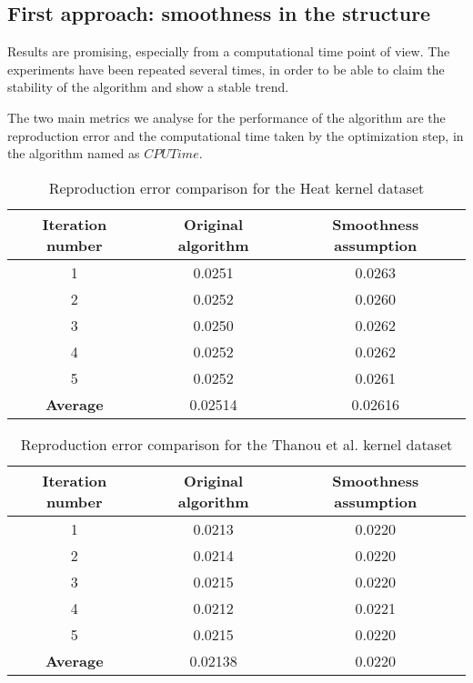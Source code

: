 \subsection{First approach: smoothness in the structure}
Results are promising, especially from a computational time point of view. The experiments have been repeated several times, in order to be able to claim the stability of the algorithm and show a stable trend.

The two main metrics we analyse for the performance of the algorithm are the reproduction error and the computational time taken by the optimization step, in the algorithm named as $CPUTime$.

\begin{table}[htbp]
  \centering
  \begin{tabular}{c|c|c}
    \multicolumn{1}{c|}{\textbf{Iteration number}} &
    \multicolumn{1}{c}{\textbf{Original algorithm}} &
    \multicolumn{1}{|c}{\textbf{Smoothness assumption}}\\
    \hline
    1 & 0.0251 & 0.0263\\
    2 & 0.0252 & 0.0260\\
    3 & 0.0250 & 0.0262\\
    4 & 0.0252 & 0.0262\\
    5 & 0.0252 & 0.0261\\
    \textbf{Average} & 0.02514 & 0.02616\\
  \end{tabular}
  \caption{Reproduction error comparison for the Heat kernel dataset}
  \label{tab:errorHeat_struct}
\end{table}

\begin{table}[htbp]
  \centering
  \begin{tabular}{c|c|c}
    \multicolumn{1}{c|}{\textbf{Iteration number}} &
    \multicolumn{1}{c}{\textbf{Original algorithm}} &
    \multicolumn{1}{|c}{\textbf{Smoothness assumption}}\\
    \hline
    1 & 0.0213 & 0.0220\\
    2 & 0.0214 & 0.0220\\
    3 & 0.0215 & 0.0220\\
    4 & 0.0212 & 0.0221\\
    5 & 0.0215 & 0.0220\\
    \textbf{Average} & 0.02138 & 0.0220\\
  \end{tabular}
  \caption{Reproduction error comparison for the Thanou et al. kernel dataset}
  \label{tab:errorDorina_struct}
\end{table}

